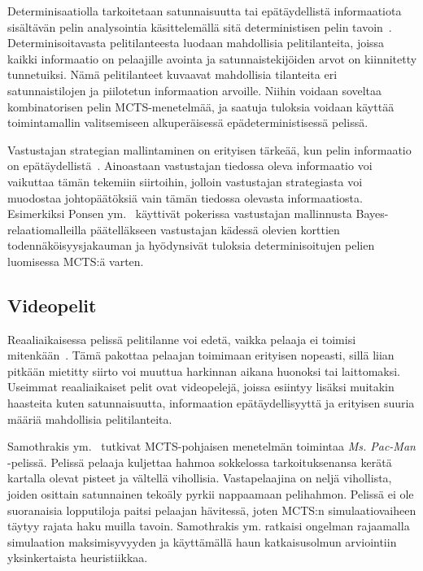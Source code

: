\documentclass[12pt,finnish]{tktltiki2}
\theoremstyle{definition}
\theoremstyle{remark}
\begin{document}
Determinisaatiolla tarkoitetaan satunnaisuutta tai epätäydellistä informaatiota sisältävän pelin analysointia käsittelemällä sitä deterministisen pelin tavoin~\cite{browne}. Determinisoitavasta pelitilanteesta luodaan mahdollisia pelitilanteita, joissa kaikki informaatio on pelaajille avointa ja satunnaistekijöiden arvot on kiinnitetty tunnetuiksi. Nämä pelitilanteet kuvaavat mahdollisia tilanteita eri satunnaistilojen ja piilotetun informaation arvoille. Niihin voidaan soveltaa kombinatorisen pelin MCTS-menetelmää, ja saatuja tuloksia voidaan käyttää toimintamallin valitsemiseen alkuperäisessä epädeterministisessä pelissä.

Vastustajan strategian mallintaminen on erityisen tärkeää, kun pelin informaatio on epätäydellistä~\cite{browne}. Ainoastaan vastustajan tiedossa oleva informaatio voi vaikuttaa tämän tekemiin siirtoihin, jolloin vastustajan strategiasta voi muodostaa johtopäätöksiä vain tämän tiedossa olevasta informaatiosta. Esimerkiksi Ponsen ym.~\cite{ponsen} käyttivät pokerissa vastustajan mallinnusta Bayes-relaatiomalleilla päätelläkseen vastustajan kädessä olevien korttien todennäköisyysjakauman ja hyödynsivät tuloksia determinisoitujen pelien luomisessa MCTS:ä varten.

\subsection{Videopelit}

Reaaliaikaisessa pelissä pelitilanne voi edetä, vaikka pelaaja ei toimisi mitenkään~\cite{browne}. Tämä pakottaa pelaajan toimimaan erityisen nopeasti, sillä liian pitkään mietitty siirto voi muuttua harkinnan aikana huonoksi tai laittomaksi. Useimmat reaaliaikaiset pelit ovat videopelejä, joissa esiintyy lisäksi muitakin haasteita kuten satunnaisuutta, informaation epätäydellisyyttä ja erityisen suuria määriä mahdollisia pelitilanteita.

Samothrakis ym.~\cite{samothrakis} tutkivat MCTS-pohjaisen menetelmän toimintaa \textit{Ms. Pac-Man} -pelissä. Pelissä pelaaja kuljettaa hahmoa sokkelossa tarkoituksenansa kerätä kartalla olevat pisteet ja vältellä vihollisia. Vastapelaajina on neljä vihollista, joiden osittain satunnainen tekoäly pyrkii nappaamaan pelihahmon. Pelissä ei ole suoranaisia lopputiloja paitsi pelaajan hävitessä, joten MCTS:n simulaatiovaiheen täytyy rajata haku muilla tavoin. Samothrakis ym. ratkaisi ongelman rajaamalla simulaation maksimisyvyyden ja käyttämällä haun katkaisusolmun arviointiin yksinkertaista heuristiikkaa.
\end{document}
